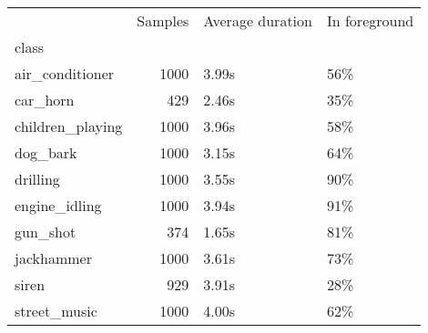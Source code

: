 \begin{tabular}{lrll}
\toprule
{} &  Samples & Average duration & In foreground \\
class            &          &                  &               \\
\midrule
air\_conditioner  &     1000 &            3.99s &           56\% \\
car\_horn         &      429 &            2.46s &           35\% \\
children\_playing &     1000 &            3.96s &           58\% \\
dog\_bark         &     1000 &            3.15s &           64\% \\
drilling         &     1000 &            3.55s &           90\% \\
engine\_idling    &     1000 &            3.94s &           91\% \\
gun\_shot         &      374 &            1.65s &           81\% \\
jackhammer       &     1000 &            3.61s &           73\% \\
siren            &      929 &            3.91s &           28\% \\
street\_music     &     1000 &            4.00s &           62\% \\
\bottomrule
\end{tabular}

